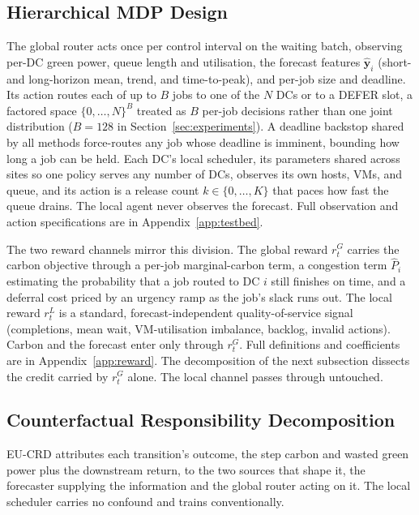 \documentclass{article} %
\begin{document}
\subsection{Hierarchical MDP Design}
\label{sec:mdp}
The global router acts once per control interval on the waiting batch, observing per-DC green power, queue length and utilisation, the forecast features $\hat{\mathbf{y}}_i$ (short- and long-horizon mean, trend, and time-to-peak), and per-job size and deadline. Its action routes each of up to $B$ jobs to one of the $N$ DCs or to a DEFER slot, a factored space $\{0,\dots,N\}^{B}$ treated as $B$ per-job decisions rather than one joint distribution ($B{=}128$ in Section~\ref{sec:experiments}). A deadline backstop shared by all methods force-routes any job whose deadline is imminent, bounding how long a job can be held. Each DC's local scheduler, its parameters shared across sites so one policy serves any number of DCs, observes its own hosts, VMs, and queue, and its action is a release count $k\in\{0,\dots,K\}$ that paces how fast the queue drains. The local agent never observes the forecast. Full observation and action specifications are in Appendix~\ref{app:testbed}.

The two reward channels mirror this division. The global reward $r^{G}_t$ carries the carbon objective through a per-job marginal-carbon term, a congestion term $\hat{P}_i$ estimating the probability that a job routed to DC $i$ still finishes on time, and a deferral cost priced by an urgency ramp as the job's slack runs out. The local reward $r^{L}_t$ is a standard, forecast-independent quality-of-service signal (completions, mean wait, VM-utilisation imbalance, backlog, invalid actions). Carbon and the forecast enter only through $r^{G}_t$. Full definitions and coefficients are in Appendix~\ref{app:reward}. The decomposition of the next subsection dissects the credit carried by $r^{G}_t$ alone. The local channel passes through untouched.

\subsection{Counterfactual Responsibility Decomposition}
\label{sec:crd}

EU-CRD attributes each transition's outcome, the step carbon and wasted green power plus the downstream return, to the two sources that shape it, the forecaster supplying the information and the global router acting on it. The local scheduler carries no confound and trains conventionally.
\end{document}
